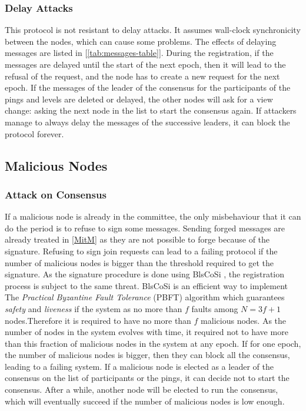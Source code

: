 \documentclass[a4paper,11pt,oneside]{report}
\begin{document}
\subsubsection{Delay Attacks}
This protocol is not resistant to delay attacks. It assumes
wall-clock synchronicity between the nodes, which can cause some problems. The
effects of delaying messages are listed in [\autoref{tab:messages-table}]. During
the registration, if the messages are delayed until the start of the next
epoch, then it will lead to the refusal of the request, and the node has to
create a new request for the next epoch. If the messages of the leader of the
consensus for the participants of the pings and levels are deleted or delayed,
the other nodes will ask for a view change: asking the next node in the list
to start the consensus again. If attackers manage to always delay the messages of the successive leaders, it can block the protocol forever.

\subsection{Malicious Nodes}
\subsubsection{Attack on Consensus}
If a malicious node is already in the committee, the only misbehaviour that it
can do the period is to refuse to sign some messages. Sending forged messages
are already treated in \autoref{MitM} as they are not possible to forge because
of the signature. Refusing to sign join requests can lead to a failing protocol
if the number of malicious nodes is bigger than the threshold required to get
the signature. As the signature procedure is done using BlsCoSi \cite{Boneh2018},
the registration process is subject to the same threat. BlsCoSi
\cite{Boneh2018} is an efficient way to implement The \textit{Practical
Byzantine Fault Tolerance} (PBFT) \cite{Castro1999} algorithm which guarantees
\textit{safety} and \textit{liveness} if the system as no more than $f$ faults
among $N = 3f+1$ nodes.Therefore it is required to have no more than $f$
malicious nodes. As the number of nodes in the system evolves
with time, it required not to have more than this fraction of malicious nodes
in the system at any epoch. If for one epoch, the number of malicious nodes is
bigger, then they can block all the consensus, leading to a failing system. 
If a malicious node is elected as a leader of the consensus on the list of
participants or the pings, it can decide not to start the consensus. After a
while, another node will be elected to run the consensus, which will eventually
succeed if the number of malicious nodes is low enough.
\end{document}

